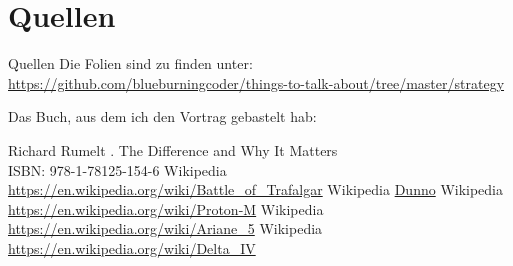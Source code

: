 \documentclass[12pt,compress,ngerman,utf8,t]{beamer}
\begin{document}
\section{Quellen}
\begin{frame}{Quellen}
    Die Folien sind zu finden unter: \\
    \url{https://github.com/blueburningcoder/things-to-talk-about/tree/master/strategy}


    Das Buch, aus dem ich den Vortrag gebastelt hab:

    \begin{thebibliography}{10}
    \beamertemplatebookbibitems
        Richard Rumelt
        .
        \newblock The Difference and Why It Matters \\
                  ISBN: 978-1-78125-154-6
    \beamertemplatearticlebibitems
        Wikipedia
            \newblock \url{https://en.wikipedia.org/wiki/Battle\_of\_Trafalgar}
        Wikipedia
            \newblock \url{Dunno}
        Wikipedia
            \newblock \url{https://en.wikipedia.org/wiki/Proton-M}
        Wikipedia
            \newblock \url{https://en.wikipedia.org/wiki/Ariane\_5}
        Wikipedia
            \newblock \url{https://en.wikipedia.org/wiki/Delta\_IV}
    \end{thebibliography}


\end{frame}
\end{document}
